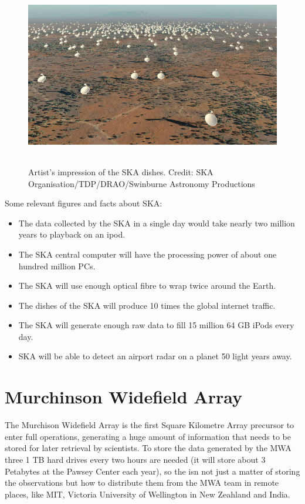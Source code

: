  \begin{figure}[tb]
 \centering
 \includegraphics[height=8cm]{images/ska.jpg}
 \caption{Artist's impression of the SKA dishes. Credit: SKA Organisation/TDP/DRAO/Swinburne Astronomy Productions}
 \end{figure}

Some relevant figures and facts about SKA:

\begin{itemize}

\item The data collected by the SKA in a single day would take nearly two million years to playback on an ipod.
\item The SKA central computer will have the processing power of about one hundred million PCs.
\item The SKA will use enough optical fibre to wrap twice around the Earth.
\item The dishes of the SKA will produce 10 times the global internet traffic.
\item The SKA will generate enough raw data to fill 15 million 64 GB iPods every day.
\item SKA will be able to detect an airport radar on a planet 50 light years away.

\end{itemize}




\section{Murchinson Widefield Array}


The Murchison Widefield Array is the first Square Kilometre Array precursor to enter full operations, generating a huge amount of information that needs to be stored for later retrieval by scientists. To store the data generated by the MWA three 1 TB hard drives every two hours are needed (it will store about 3 Petabytes at the Pawsey Center each year), so the isn not just a matter of storing the observations but how to distribute them from the MWA team in remote places, like MIT, Victoria University of Wellington in New Zeahland and India. 


